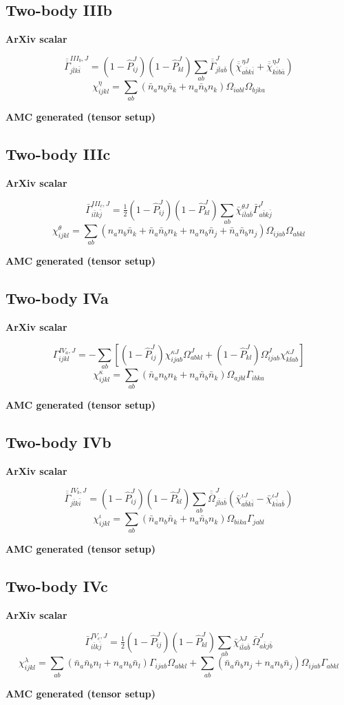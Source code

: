 \documentclass[11pt]{article}
\newcommand{\CompareBlock}[3]{%
\subsection*{#1}
\noindent
\begin{minipage}[t]{0.48\textwidth}
\textbf{ArXiv scalar}
#2
\end{minipage}\hfill
\begin{minipage}[t]{0.48\textwidth}
\textbf{AMC generated (tensor setup)}

\end{minipage}
\vspace{1em}
}
\begin{document}
\CompareBlock{Two-body IIIb}{
\begin{equation*}
\overline{\overline\Gamma}^{III_b,J}_{j\bar l k\bar i}=(1-\hat P^J_{ij})(1-\hat P^J_{kl})\sum_{ab}\overline{\overline\Gamma}^J_{j\bar l a\bar b}\left(\overline{\overline\chi}^{\eta J}_{a\bar b k\bar i}+\overline{\overline\chi}^{\eta J}_{k\bar i b\bar a}\right)
\end{equation*}
\begin{equation*}
 \chi^{\eta}_{ijkl}=\sum_{ab}\left(\bar n_a n_b\bar n_k+n_a\bar n_b n_k\right)\Omega_{iabl}\Omega_{bjka}
\end{equation*}
}{amc_eq_snippets_clean/dc_G3b_tensor_clean_body.tex}

\CompareBlock{Two-body IIIc}{
\begin{equation*}
\bar\Gamma^{III_c,J}_{i\bar l k\bar j}=\tfrac12(1-\hat P^J_{ij})(1-\hat P^J_{kl})\sum_{ab}\bar\chi^{\theta J}_{i\bar l a\bar b}\bar\Gamma^J_{a\bar b k\bar j}
\end{equation*}
\begin{equation*}
 \chi^{\theta}_{ijkl}=\sum_{ab}\left(n_a n_b\bar n_k+\bar n_a\bar n_b n_k+n_a n_b\bar n_j+\bar n_a\bar n_b n_j\right)\Omega_{ijab}\Omega_{abkl}
\end{equation*}
}{amc_eq_snippets_clean/dc_G3c_tensor_clean_body.tex}

\CompareBlock{Two-body IVa}{
\begin{equation*}
\Gamma^{IV_a,J}_{ijkl}=-\sum_{ab}\left[(1-\hat P^J_{ij})\chi^{\kappa J}_{ijab}\Omega^J_{abkl}+(1-\hat P^J_{kl})\Omega^J_{ijab}\chi^{\kappa J}_{klab}\right]
\end{equation*}
\begin{equation*}
 \chi^{\kappa}_{ijkl}=\sum_{ab}\left(\bar n_a n_b n_k+n_a\bar n_b\bar n_k\right)\Omega_{ajbl}\Gamma_{ibka}
\end{equation*}
}{amc_eq_snippets_clean/dc_G4a_tensor_clean_body.tex}

\CompareBlock{Two-body IVb}{
\begin{equation*}
\overline{\overline\Gamma}^{IV_b,J}_{j\bar l k\bar i}=(1-\hat P^J_{ij})(1-\hat P^J_{kl})\sum_{ab}\overline{\overline\Omega}^{J}_{j\bar l a\bar b}\left(\bar\chi^{\iota J}_{a\bar b k\bar i}-\bar\chi^{\iota J}_{k\bar i a\bar b}\right)
\end{equation*}
\begin{equation*}
 \chi^{\iota}_{ijkl}=\sum_{ab}\left(\bar n_a n_b\bar n_k+n_a\bar n_b n_k\right)\Omega_{bika}\Gamma_{jabl}
\end{equation*}
}{amc_eq_snippets_clean/dc_G4b_tensor_clean_body.tex}

\CompareBlock{Two-body IVc}{
\begin{equation*}
\bar\Gamma^{IV_c,J}_{i\bar l k\bar j}=\tfrac12(1-\hat P^J_{ij})(1-\hat P^J_{kl})\sum_{ab}\bar\chi^{\lambda J}_{i\bar l a\bar b}\,\bar\Omega^J_{a\bar k j\bar b}
\end{equation*}
\begin{equation*}
 \chi^{\lambda}_{ijkl}=\sum_{ab}\left(\bar n_a\bar n_b n_l+n_a n_b\bar n_l\right)\Gamma_{ijab}\Omega_{abkl}+\sum_{ab}\left(\bar n_a\bar n_b n_j+n_a n_b\bar n_j\right)\Omega_{ijab}\Gamma_{abkl}
\end{equation*}
}{amc_eq_snippets_clean/dc_G4c_tensor_clean_body.tex}
\end{document}
